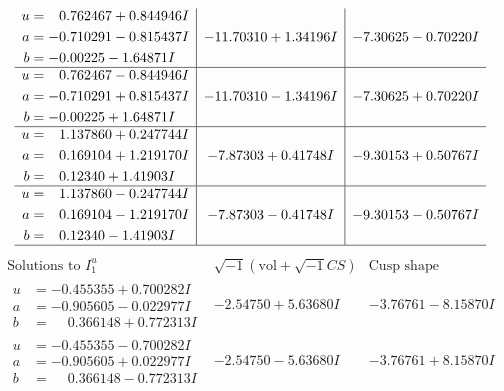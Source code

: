 \documentclass[1p]{elsarticle_modified}
\theoremstyle{definition}
\newcommand{\I}{\sqrt{-1}}
\begin{document}
$$\begin{array}{c|c|c}
\begin{aligned}
u &= \phantom{-}0.762467 + 0.844946 I \\
a &= -0.710291 - 0.815437 I \\
b &= -0.00225 - 1.64871 I\end{aligned}
 & -11.70310 + 1.34196 I & -7.30625 - 0.70220 I \\ \hline\begin{aligned}
u &= \phantom{-}0.762467 - 0.844946 I \\
a &= -0.710291 + 0.815437 I \\
b &= -0.00225 + 1.64871 I\end{aligned}
 & -11.70310 - 1.34196 I & -7.30625 + 0.70220 I \\ \hline\begin{aligned}
u &= \phantom{-}1.137860 + 0.247744 I \\
a &= \phantom{-}0.169104 + 1.219170 I \\
b &= \phantom{-}0.12340 + 1.41903 I\end{aligned}
 & -7.87303 + 0.41748 I & -9.30153 + 0.50767 I \\ \hline\begin{aligned}
u &= \phantom{-}1.137860 - 0.247744 I \\
a &= \phantom{-}0.169104 - 1.219170 I \\
b &= \phantom{-}0.12340 - 1.41903 I\end{aligned}
 & -7.87303 - 0.41748 I & -9.30153 - 0.50767 I\\
 \hline 
 \end{array}$$\newpage$$\begin{array}{c|c|c}  
\text{Solutions to }I^u_{1}& \I (\text{vol} + \sqrt{-1}CS) & \text{Cusp shape}\\
 \hline 
\begin{aligned}
u &= -0.455355 + 0.700282 I \\
a &= -0.905605 - 0.022977 I \\
b &= \phantom{-}0.366148 + 0.772313 I\end{aligned}
 & -2.54750 + 5.63680 I & -3.76761 - 8.15870 I \\ \hline\begin{aligned}
u &= -0.455355 - 0.700282 I \\
a &= -0.905605 + 0.022977 I \\
b &= \phantom{-}0.366148 - 0.772313 I\end{aligned}
 & -2.54750 - 5.63680 I & -3.76761 + 8.15870 I \\ \hline\begin{aligned}

\end{aligned}
\end{array}$$
\end{document}
